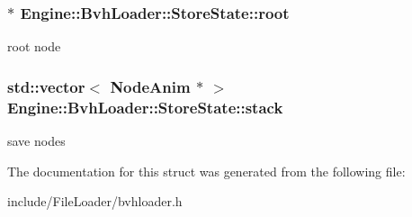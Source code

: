 \subsubsection[{root}]{$\ast$ Engine\+::\+Bvh\+Loader\+::\+Store\+State\+::root}\label{structEngine_1_1BvhLoader_1_1StoreState_ac01f720a48885dc6e03901b9765b2db2}
root node \hypertarget{structEngine_1_1BvhLoader_1_1StoreState_a778ff6ec18f3ccb194bdbd0a8342d3f6}{}
\subsubsection[{stack}]{\setlength{\rightskip}{0pt plus 5cm}std\+::vector$<$ {\bf Node\+Anim} $\ast$ $>$ Engine\+::\+Bvh\+Loader\+::\+Store\+State\+::stack}\label{structEngine_1_1BvhLoader_1_1StoreState_a778ff6ec18f3ccb194bdbd0a8342d3f6}
save nodes 

The documentation for this struct was generated from the following file\+:\begin{DoxyCompactItemize}
\item 
include/\+File\+Loader/bvhloader.\+h\end{DoxyCompactItemize}
